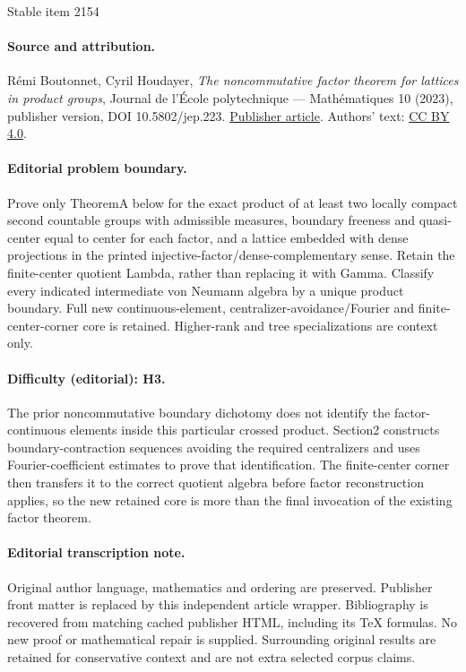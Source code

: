 \documentclass[11pt]{article}
\theoremstyle{definition}
\begin{document}
\begin{center}{\Large Stable item 2154}\end{center}
\paragraph{Source and attribution.}
Rémi Boutonnet, Cyril Houdayer, \emph{The noncommutative factor theorem for lattices in product groups}, Journal de l’École polytechnique — Mathématiques 10 (2023), publisher version, DOI 10.5802/jep.223. \href{https://jep.centre-mersenne.org/articles/10.5802/jep.223/}{Publisher article}. Authors' text: \href{https://creativecommons.org/licenses/by/4.0/}{CC BY 4.0}.
\paragraph{Editorial problem boundary.}
Prove only TheoremA below for the exact product of at least two locally compact second countable groups with admissible measures, boundary freeness and quasi-center equal to center for each factor, and a lattice embedded with dense projections in the printed injective-factor/dense-complementary sense. Retain the finite-center quotient Lambda, rather than replacing it with Gamma. Classify every indicated intermediate von Neumann algebra by a unique product boundary. Full new continuous-element, centralizer-avoidance/Fourier and finite-center-corner core is retained. Higher-rank and tree specializations are context only.
\paragraph{Difficulty (editorial): H3.}
The prior noncommutative boundary dichotomy does not identify the factor-continuous elements inside this particular crossed product. Section2 constructs boundary-contraction sequences avoiding the required centralizers and uses Fourier-coefficient estimates to prove that identification. The finite-center corner then transfers it to the correct quotient algebra before factor reconstruction applies, so the new retained core is more than the final invocation of the existing factor theorem.
\paragraph{Editorial transcription note.}
Original author language, mathematics and ordering are preserved. Publisher front matter is replaced by this independent article wrapper. Bibliography is recovered from matching cached publisher HTML, including its TeX formulas. No new proof or mathematical repair is supplied. Surrounding original results are retained for conservative context and are not extra selected corpus claims.
\clearpage
\end{document}
